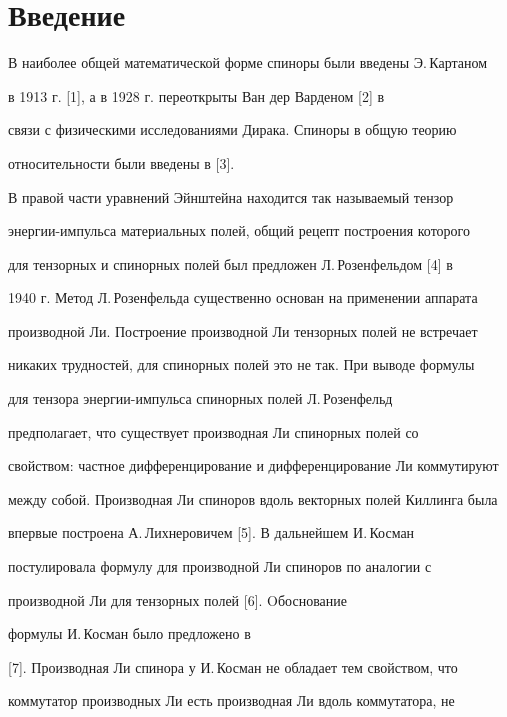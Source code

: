 \label{begin}








\section{Введение}





В наиболее общей математической форме спиноры были введены Э.\,Картаном


в 1913 г. [1], а в 1928 г. переоткрыты Ван дер Варденом [2] в


связи с физическими исследованиями Дирака. Спиноры в общую теорию


относительности были введены в [3].


В правой части уравнений Эйнштейна находится так называемый тензор


энергии-импульса материальных полей, общий рецепт построения которого


для тензорных и спинорных полей был предложен Л.\,Розенфельдом [4] в


1940 г. Метод Л.\,Розенфельда существенно основан на применении аппарата


производной Ли. Построение производной Ли тензорных полей не встречает


никаких трудностей, для спинорных полей это не так. При выводе формулы


для тензора энергии-импульса спинорных полей Л.\,Розенфельд


предполагает, что существует производная Ли спинорных полей со


свойством: частное дифференцирование и дифференцирование Ли коммутируют


между собой. Производная Ли спиноров вдоль векторных полей Киллинга была


впервые построена А.\,Лихнеровичем [5]. В дальнейшем И.\,Косман


постулировала формулу для производной Ли спиноров по аналогии с


производной Ли для тензорных полей [6]. Oбоснование


формулы И.\,Косман было предложено в 


[7]. Производная Ли спинора у И.\,Косман не обладает тем свойством, что


коммутатор производных Ли есть производная Ли вдоль коммутатора, не


